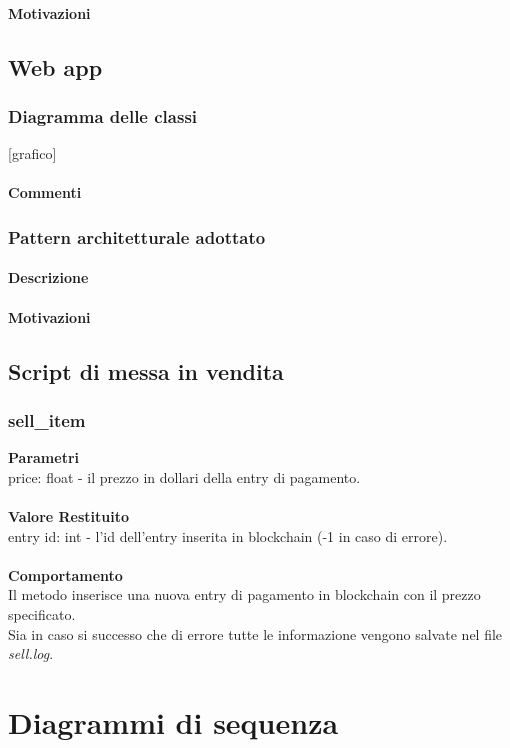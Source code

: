 \documentclass[a4paper, 12pt]{article}
\begin{document}
\paragraph{Motivazioni}

\subsection{Web app}
\subsubsection{Diagramma delle classi}
[grafico]
\paragraph{Commenti}
\subsubsection{Pattern architetturale adottato}
\paragraph{Descrizione}
\paragraph{Motivazioni}

\subsection{Script di messa in vendita}
\subsubsection{sell\_item}
\textbf{Parametri}\\
price: float - il prezzo in dollari della entry di pagamento.\\\\
\textbf{Valore Restituito}\\
entry id: int - l'id dell'entry inserita in blockchain (-1 in caso di errore).\\\\
\textbf{Comportamento}\\
Il metodo inserisce una nuova entry di pagamento in blockchain con il prezzo specificato.\\
Sia in caso si successo che di errore tutte le informazione vengono salvate nel file \textit{sell.log}.

\section{Diagrammi di sequenza}
\end{document}
